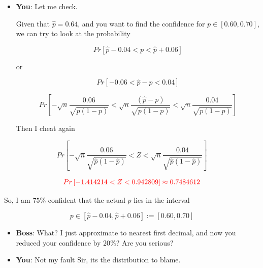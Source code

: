 \documentclass{beamer}\usepackage[]{graphicx}\usepackage[]{color}
\begin{document}
\begin{frame}[fragile]

\begin{itemize}

\item \textbf{You}: Let me check. \pause

Given that $\hat{p}=0.64$, and you want to find the confidence for $p \in \left [ 0.60, 0.70 \right]$, we can try to look at the probability

$$ Pr \left [ \hat{p} - 0.04 < p < \hat{p} + 0.06 \right ] $$ \pause

or

$$ Pr \left [ -0.06 < \hat{p} - p < 0.04 \right ] $$  \pause

$$ Pr \left [ -\sqrt{n} \frac{0.06}{\sqrt{p(1-p)}} < \sqrt{n}\frac{(\hat{p} - p)}{\sqrt{p(1-p)}} < \sqrt{n} \frac{0.04}{\sqrt{p(1-p)}} \right ] $$ \pause

Then I cheat again

\end{itemize}

\end{frame}

\begin{frame}[fragile]

$$ Pr \left [ -\sqrt{n}\frac{0.06}{\sqrt{\hat{p}(1-\hat{p})}} < Z < \sqrt{n} \frac{0.04}{\sqrt{\hat{p}(1-\hat{p})}} \right ] $$

$$ \textcolor{red}{Pr \left [ -1.414214 < Z < 0.942809 \right ] \approx 0.7484612} $$

So, I am $75 \%$ confident that the actual $p$ lies in the interval

$$ p \in [\hat{p} - 0.04, \hat{p} + 0.06] := [0.60, 0.70] $$ \pause

\begin{itemize}
\item \textbf{Boss}: What? I just approximate to nearest first decimal, and now you reduced your confidence by $20 \%$? Are you serious? \pause

\item \textbf{You}: Not my fault Sir, its the distribution to blame. \pause
\end{itemize}

\end{frame}
\end{document}
